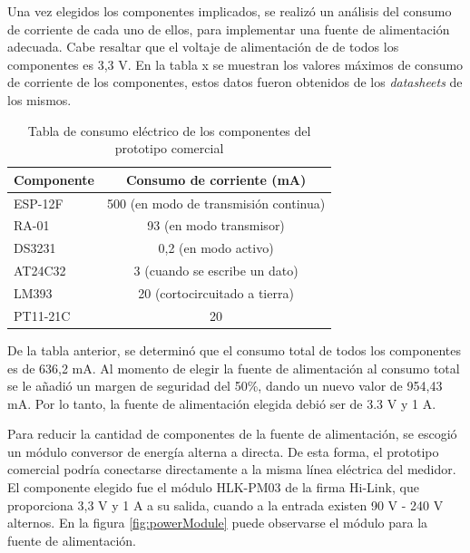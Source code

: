Una vez elegidos los componentes implicados, se realizó un análisis del consumo de corriente de cada uno de ellos, para implementar una fuente de alimentación adecuada. Cabe resaltar que el voltaje de alimentación de de todos los componentes es 3,3 V. En la tabla x se muestran los valores máximos de consumo de corriente de los componentes, estos datos fueron obtenidos de los \textit{datasheets} de los mismos.

\begin{table}[h]
	\centering
	\caption[Consumo del prototipo comercial]{Tabla de consumo eléctrico de los componentes del prototipo comercial}
	\begin{tabular}{l c}    
		\toprule
		\textbf{Componente} & \textbf{Consumo de corriente (mA)} \\
		\midrule
		ESP-12F 	& 500 (en modo de transmisión continua) \\		
		RA-01		& 93 (en modo transmisor)\\
		DS3231		& 0,2 (en modo activo) \\
		AT24C32 	& 3 (cuando se escribe un dato)\\
		LM393 		& 20 (cortocircuitado a tierra) \\
		PT11-21C	& 20 \\
		\bottomrule
		\hline
	\end{tabular}
	\label{tab:componentsPower}
\end{table}

De la tabla anterior, se determinó que el consumo total de todos los componentes es de 636,2 mA. Al momento de elegir la fuente de alimentación al consumo total se le añadió un margen de seguridad del 50\%, dando un nuevo valor de 954,43 mA. Por lo tanto, la fuente de alimentación elegida debió ser de 3.3 V y 1 A.

Para reducir la cantidad de componentes de la fuente de alimentación, se escogió un módulo conversor de energía alterna a directa. De esta forma, el prototipo comercial podría conectarse directamente a la misma línea eléctrica del medidor. El componente elegido fue el módulo HLK-PM03 de la firma Hi-Link, que proporciona 3,3 V y 1 A a su salida, cuando a la entrada existen 90 V - 240 V alternos. En la figura \ref{fig:powerModule} puede observarse el módulo para la fuente de alimentación.

